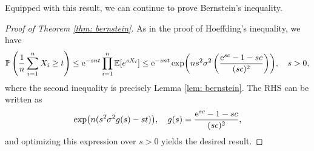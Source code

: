 Equipped with this result, we can continue to prove Bernstein's inequality.

\begin{proof}[Proof of Theorem \ref{thm: bernstein}]
As in the proof of Hoeffding's inequality, we have
\[
    \mathbb{P}\left(\frac{1}{n} \sum_{i=1}^n X_i \geq t\right) \leq \mathrm{e}^{-snt} \prod_{i=1}^n \mathbb{E}[e^{sX_i}] \leq \mathrm{e}^{-snt} \exp( n s^2 \sigma^2 \left( \frac{\mathrm{e}^{sc} - 1 - sc}{(sc)^2} \right) ), \quad s > 0,
\]
where the second inequality is precisely Lemma \ref{lem: bernstein}. The RHS can be written as
\[
    \exp( n (s^2 \sigma^2 g(s) - st) ), \quad g(s) = \frac{\mathrm{e}^{sc} - 1 - sc}{(sc)^2},
\]
and optimizing this expression over $s > 0$ yields the desired result.
\end{proof}
